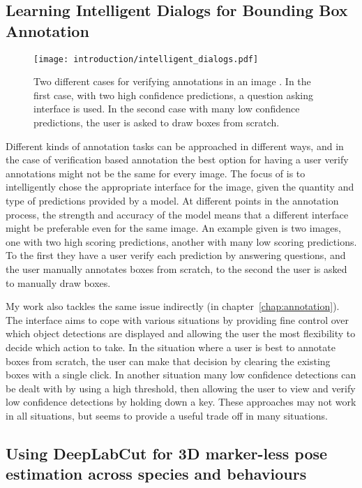 \subsection{Learning Intelligent Dialogs for Bounding Box Annotation}

\begin{figure}[h]
  \centering
  \texttt{[image: introduction/intelligent\_dialogs.pdf]}
  \caption{Two different cases for verifying annotations in an image \cite{Konyushkova2017}. In the first case, with two high confidence predictions, a question asking interface is used. In the second case with many low confidence predictions, the user is asked to draw boxes from scratch. }
  \label{fig:intelligent_dialogs}
\end{figure}

Different kinds of annotation tasks can be approached in different ways, and in the case of verification based annotation the best option for having a user verify annotations might not be the same for every image. The focus of \cite{Konyushkova2017} is to intelligently chose the appropriate interface for the image, given the quantity and type of predictions provided by a model. At different points in the annotation process, the strength and accuracy of the model means that a different interface might be preferable even for the same image. An example given is two images, one with two high scoring predictions, another with many low scoring predictions. To the first they have a user  verify each prediction by answering questions, and the user manually annotates boxes from scratch, to the second the user is asked to manually draw boxes. 


My work also tackles the same issue indirectly (in chapter~\ref{chap:annotation}). The interface aims to cope with various situations by providing fine control over which object detections are displayed and allowing the user the most flexibility to decide which action to take. In the situation where a user is best to annotate boxes from scratch, the user can make that decision by clearing the existing boxes with a single click. In another situation many low confidence detections can be dealt with by using a high threshold, then allowing the user to view and verify low confidence detections by holding down a key. These approaches may not work in all situations, but seems to provide a useful trade off in many situations.

\subsection {Using DeepLabCut for 3D marker-less pose estimation across species and behaviours \cite{Nath2018, Mathis2018}}

